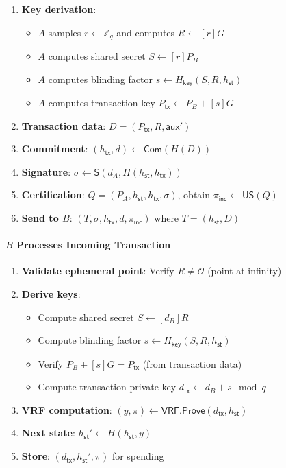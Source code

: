 \documentclass{article}
\newcommand{\sig}[0]{\mathsf{S}}
\newcommand{\commit}[0]{\mathsf{Com}}
\newcommand{\unisrv}[0]{\mathsf{US}}
\newcommand{\sthash}[0]{{h_\mathsf{st}}}
\newcommand{\txhash}[0]{{h_\mathsf{tx}}}
\newcommand{\auxd}[0]{\mathsf{aux}}
\newcommand{\pinc}[0]{{\pi_{\mathsf{inc}}}}
\begin{document}
\begin{enumerate}
\item \textbf{Key derivation}:
\begin{itemize}
\item $A$ samples $r \gets \mathbb{Z}_q$ and computes $R \gets [r]G$
\item $A$ computes shared secret $S \gets [r]P_B$
\item $A$ computes blinding factor $s \gets H_{\mathsf{key}}(S, R, \sthash)$
\item $A$ computes transaction key $P_{\mathsf{tx}} \gets P_B + [s]G$
\end{itemize}

\item \textbf{Transaction data}: $D = (P_{\mathsf{tx}}, R, \auxd')$

\item \textbf{Commitment}: $(\txhash, d) \gets \commit(H(D))$

\item \textbf{Signature}: $\sigma \gets \sig(d_A, H(\sthash, \txhash))$

\item \textbf{Certification}: $Q = (P_A, \sthash, \txhash, \sigma)$, obtain $\pinc \gets \unisrv(Q)$

\item \textbf{Send to $B$}: $(T, \sigma, \txhash, d, \pinc)$ where $T = (\sthash, D)$
\end{enumerate}

\paragraph{$B$ Processes Incoming Transaction}

\begin{enumerate}
\item \textbf{Validate ephemeral point}: Verify $R \neq \mathcal{O}$ (point at infinity)

\item \textbf{Derive keys}:
\begin{itemize}
\item Compute shared secret $S \gets [d_B]R$
\item Compute blinding factor $s \gets H_{\mathsf{key}}(S, R, \sthash)$
\item Verify $P_B + [s]G = P_{\mathsf{tx}}$ (from transaction data)
\item Compute transaction private key $d_{\mathsf{tx}} \gets d_B + s \mod q$
\end{itemize}

\item \textbf{VRF computation}: $(y, \pi) \gets \mathsf{VRF.Prove}(d_{\mathsf{tx}}, \sthash)$

\item \textbf{Next state}: $\sthash' \gets H(\sthash, y)$

\item \textbf{Store}: $(d_{\mathsf{tx}}, \sthash', \pi)$ for spending
\end{enumerate}
\end{document}
